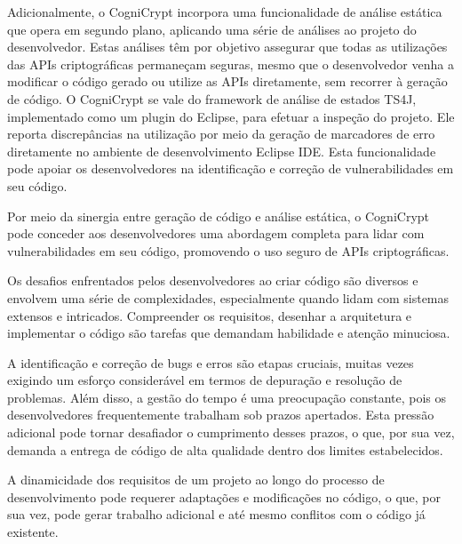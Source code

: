 Adicionalmente, o CogniCrypt incorpora uma funcionalidade de análise estática que opera em segundo plano, aplicando uma série de análises ao projeto do desenvolvedor. Estas análises têm por objetivo assegurar que todas as utilizações das APIs criptográficas permaneçam seguras, mesmo que o desenvolvedor venha a modificar o código gerado ou utilize as APIs diretamente, sem recorrer à geração de código. O CogniCrypt se vale do framework de análise de estados TS4J, implementado como um plugin do Eclipse, para efetuar a inspeção do projeto. Ele reporta discrepâncias na utilização por meio da geração de marcadores de erro diretamente no ambiente de desenvolvimento Eclipse IDE. Esta funcionalidade pode apoiar os desenvolvedores na identificação e correção de vulnerabilidades em seu código.

Por meio da sinergia entre geração de código e análise estática, o CogniCrypt pode conceder aos desenvolvedores uma abordagem completa para lidar com vulnerabilidades em seu código, promovendo o uso seguro de APIs criptográficas.



Os desafios enfrentados pelos desenvolvedores ao criar código são diversos e envolvem uma série de complexidades, especialmente quando lidam com sistemas extensos e intricados. Compreender os requisitos, desenhar a arquitetura e implementar o código são tarefas que demandam habilidade e atenção minuciosa.

A identificação e correção de bugs e erros são etapas cruciais, muitas vezes exigindo um esforço considerável em termos de depuração e resolução de problemas. Além disso, a gestão do tempo é uma preocupação constante, pois os desenvolvedores frequentemente trabalham sob prazos apertados. Esta pressão adicional pode tornar desafiador o cumprimento desses prazos, o que, por sua vez, demanda a entrega de código de alta qualidade dentro dos limites estabelecidos.

A dinamicidade dos requisitos de um projeto ao longo do processo de desenvolvimento pode requerer adaptações e modificações no código, o que, por sua vez, pode gerar trabalho adicional e até mesmo conflitos com o código já existente.

